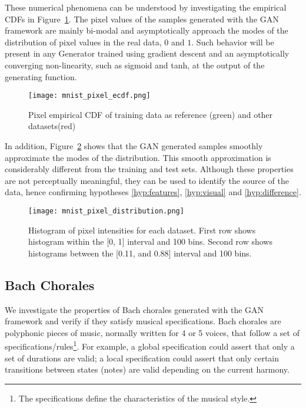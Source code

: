These numerical phenomena can be understood by investigating the empirical CDFs 
in Figure~\ref{fig:mnist_pixel_ecdf}. The pixel values of the samples
generated with the GAN framework are mainly bi-modal and asymptotically
approach the modes of the distribution of pixel values in the real data, $0$ and $1$. Such behavior will be
present in any Generator trained using gradient descent and an asymptotically converging 
non-linearity, such as sigmoid and tanh, at the output of the generating function.

\begin{figure}[!h]
  \texttt{[image: mnist\_pixel\_ecdf.png]}
    \caption{Pixel empirical CDF of training data as reference (green) and other
    datasets(red)}
  \label{fig:mnist_pixel_ecdf}
\end{figure}

In addition, Figure~\ref{fig:mnist_pixel_distribution} shows that the GAN
generated samples smoothly approximate the modes of the distribution. This
smooth approximation is considerably different from the training and test sets.
Although these properties are not perceptually meaningful, they can be used to 
identify the source of the data, hence confirming hypotheses \ref{hyp:features}, 
\ref{hyp:visual} and \ref{hyp:difference}.

\begin{figure}[!h]
  \texttt{[image: mnist\_pixel\_distribution.png]}
  \caption{Histogram of pixel intensities for each dataset. First row shows
    histogram within the [0, 1] interval and 100 bins. Second row shows
    histograms between the [0.11, and 0.88] interval and 100 bins.}
  \label{fig:mnist_pixel_distribution}
\end{figure}

\subsection{Bach Chorales}
We investigate the properties of Bach chorales generated with the GAN framework
and verify if they satisfy musical specifications.
Bach chorales are polyphonic pieces of music, normally
written for 4 or 5 voices, that follow a set of
specifications/rules\footnote{The specifications define the characteristics of the 
musical style.}. For example, a global specification could assert that only a set of
durations are valid; a local specification could assert that only certain
transitions between states (notes) are valid depending on the current harmony.

